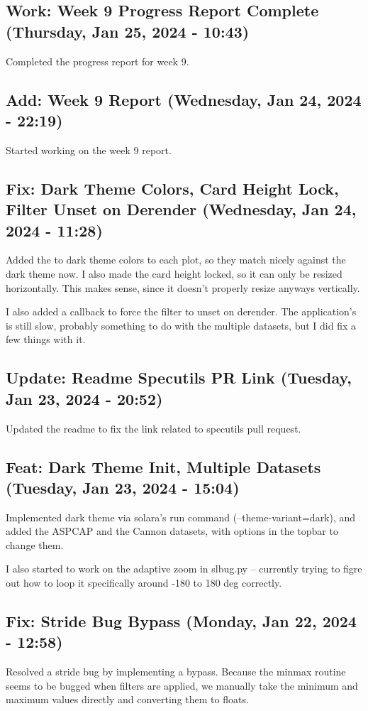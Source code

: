 \documentclass[a4paper]{article}
\begin{document}
\subsection*{Work: Week 9 Progress Report Complete (Thursday, Jan 25, 2024 - 10:43)}
Completed the progress report for week 9.

\subsection*{Add: Week 9 Report (Wednesday, Jan 24, 2024 - 22:19)}
Started working on the week 9 report.

\subsection*{Fix: Dark Theme Colors, Card Height Lock, Filter Unset on Derender (Wednesday, Jan 24, 2024 - 11:28)}
Added the to dark theme colors to each plot, so they match nicely against the dark theme now. I also made the card height locked, so it can only be resized horizontally. This makes sense, since it doesn't properly resize anyways vertically.

I also added a callback to force the filter to unset on derender. The application's is still slow, probably something to do with the multiple datasets, but I did fix a few things with it.

\subsection*{Update: Readme Specutils PR Link (Tuesday, Jan 23, 2024 - 20:52)}
Updated the readme to fix the link related to specutils pull request.

\subsection*{Feat: Dark Theme Init, Multiple Datasets (Tuesday, Jan 23, 2024 - 15:04)}
Implemented dark theme via solara's run command (--theme-variant=dark), and added the ASPCAP and the Cannon datasets, with options in the topbar to change them.

I also started to work on the adaptive zoom in slbug.py -- currently trying to figre out how to loop it specifically around -180 to 180 deg correctly.

\subsection*{Fix: Stride Bug Bypass (Monday, Jan 22, 2024 - 12:58)}
Resolved a stride bug by implementing a bypass. Because the minmax routine seems to be bugged when filters are applied, we manually take the minimum and maximum values directly and converting them to floats.
\end{document}
